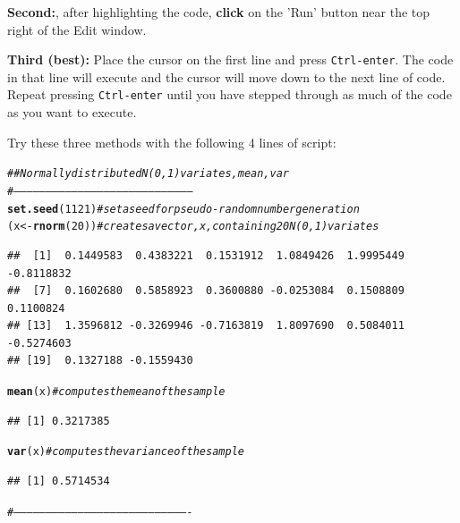 \documentclass[titlepage]{book}
\makeatletter
\newcommand{\hlnum}[1]{\textcolor[rgb]{0.686,0.059,0.569}{#1}}%
\newcommand{\hlcom}[1]{\textcolor[rgb]{0.678,0.584,0.686}{\textit{#1}}}%
\newcommand{\hlstd}[1]{\textcolor[rgb]{0.345,0.345,0.345}{#1}}%
\newcommand{\hlkwb}[1]{\textcolor[rgb]{0.69,0.353,0.396}{#1}}%
\newcommand{\hlkwd}[1]{\textcolor[rgb]{0.737,0.353,0.396}{\textbf{#1}}}%
\newenvironment{kframe}{%
 \def\at@end@of@kframe{}%
 \ifinner\ifhmode%
  \def\at@end@of@kframe{\end{minipage}}%
  \begin{minipage}{\columnwidth}%
 \fi\fi%
 \def\FrameCommand##1{\hskip\@totalleftmargin \hskip-\fboxsep
 \colorbox{shadecolor}{##1}\hskip-\fboxsep
     \hskip-\linewidth \hskip-\@totalleftmargin \hskip\columnwidth}%
 \MakeFramed {\advance\hsize-\width
   \@totalleftmargin\z@ \linewidth\hsize
   \@setminipage}}%
 {\par\unskip\endMakeFramed%
 \at@end@of@kframe}
\newenvironment{knitrout}{}{} %
\makeatother
\begin{document}
\textbf{Second:}, after highlighting the code, \textbf{click} on the 'Run' button near the top right of the Edit window.

\textbf{Third (best):} Place the cursor on the first line and press \texttt{Ctrl-enter}. The code in that line will execute and the cursor will move down to the next line of code. Repeat pressing \texttt{Ctrl-enter} until you have stepped through as much of the code as you want to execute.

Try these three methods with the following 4 lines of script:

\begin{knitrout}
\color{fgcolor}\begin{kframe}
\begin{alltt}
  \hlcom{##Normally distributed N(0,1) variates, mean, var}
  \hlcom{#-----------------------------------------------------------------------------------}
\hlkwd{set.seed}\hlstd{(}\hlnum{1121}\hlstd{)}  \hlcom{# set a seed for pseudo-random number generation}
\hlstd{(x} \hlkwb{<-} \hlkwd{rnorm}\hlstd{(}\hlnum{20}\hlstd{))}   \hlcom{# creates a vector, x, containing 20 N(0,1) variates}
\end{alltt}
\begin{verbatim}
##  [1]  0.1449583  0.4383221  0.1531912  1.0849426  1.9995449 -0.8118832
##  [7]  0.1602680  0.5858923  0.3600880 -0.0253084  0.1508809  0.1100824
## [13]  1.3596812 -0.3269946 -0.7163819  1.8097690  0.5084011 -0.5274603
## [19]  0.1327188 -0.1559430
\end{verbatim}
\begin{alltt}
\hlkwd{mean}\hlstd{(x)}         \hlcom{# computes the mean of the sample}
\end{alltt}
\begin{verbatim}
## [1] 0.3217385
\end{verbatim}
\begin{alltt}
\hlkwd{var}\hlstd{(x)}          \hlcom{# computes the variance of the sample}
\end{alltt}
\begin{verbatim}
## [1] 0.5714534
\end{verbatim}
\begin{alltt}
\hlcom{#----------------------------------------------------------------------------------}
\end{alltt}
\end{kframe}
\end{knitrout}
\end{document}
